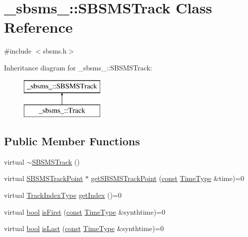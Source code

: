 \hypertarget{class__sbsms___1_1_s_b_s_m_s_track}{}\section{\+\_\+sbsms\+\_\+\+:\+:S\+B\+S\+M\+S\+Track Class Reference}
\label{class__sbsms___1_1_s_b_s_m_s_track}


{\ttfamily \#include $<$sbsms.\+h$>$}

Inheritance diagram for \+\_\+sbsms\+\_\+\+:\+:S\+B\+S\+M\+S\+Track\+:\begin{figure}[H]
\begin{center}
\leavevmode
\includegraphics[height=2.000000cm]{class__sbsms___1_1_s_b_s_m_s_track}
\end{center}
\end{figure}
\subsection*{Public Member Functions}
\begin{DoxyCompactItemize}
\item 
virtual \hyperlink{class__sbsms___1_1_s_b_s_m_s_track_a75b51d90861a9ff6f496cdfad59d4846}{$\sim$\+S\+B\+S\+M\+S\+Track} ()
\item 
virtual \hyperlink{class__sbsms___1_1_s_b_s_m_s_track_point}{S\+B\+S\+M\+S\+Track\+Point} $\ast$ \hyperlink{class__sbsms___1_1_s_b_s_m_s_track_a491cf0280a3048e5ea70ff9abcfdb820}{get\+S\+B\+S\+M\+S\+Track\+Point} (\hyperlink{getopt1_8c_a2c212835823e3c54a8ab6d95c652660e}{const} \hyperlink{namespace__sbsms___a3a161c3deff71e932c0ec86aad54eb7c}{Time\+Type} \&time)=0
\item 
virtual \hyperlink{namespace__sbsms___a92908dbd644f9cd709ffe3608e9e4510}{Track\+Index\+Type} \hyperlink{class__sbsms___1_1_s_b_s_m_s_track_ac052642472a14ceeb325102e8cff37d6}{get\+Index} ()=0
\item 
virtual \hyperlink{mac_2config_2i386_2lib-src_2libsoxr_2soxr-config_8h_abb452686968e48b67397da5f97445f5b}{bool} \hyperlink{class__sbsms___1_1_s_b_s_m_s_track_ae57870fd1964369b646834b3ddff276b}{is\+First} (\hyperlink{getopt1_8c_a2c212835823e3c54a8ab6d95c652660e}{const} \hyperlink{namespace__sbsms___a3a161c3deff71e932c0ec86aad54eb7c}{Time\+Type} \&synthtime)=0
\item 
virtual \hyperlink{mac_2config_2i386_2lib-src_2libsoxr_2soxr-config_8h_abb452686968e48b67397da5f97445f5b}{bool} \hyperlink{class__sbsms___1_1_s_b_s_m_s_track_a3a64e6d92f87df00b5ec11960f115729}{is\+Last} (\hyperlink{getopt1_8c_a2c212835823e3c54a8ab6d95c652660e}{const} \hyperlink{namespace__sbsms___a3a161c3deff71e932c0ec86aad54eb7c}{Time\+Type} \&synthtime)=0
\end{DoxyCompactItemize}


